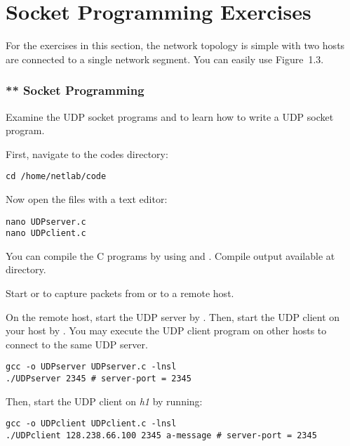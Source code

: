 \documentclass{../UTNetLab}
\begin{document}
\part{Socket Programming Exercises}
For the exercises in this section, the network topology is simple with two hosts are connected to a single network segment.
You can easily use Figure~1.3.

\section{** Socket Programming}
Examine the UDP socket programs  and  to learn how to write a UDP socket program.

First, navigate to the codes directory:

\begin{lstlisting}
cd /home/netlab/code
\end{lstlisting}

Now open the files with a text editor:

\begin{lstlisting}
nano UDPserver.c
nano UDPclient.c
\end{lstlisting}

You can compile the C programs by using  and .
Compile output available at  directory.

Start  or  to capture packets from or to a remote host.

On the remote host, start the UDP server by .
Then, start the UDP client on your host by .
You may execute the UDP client program on other hosts to connect to the same UDP server.

\begin{lstlisting}[emph={server-port}]
gcc -o UDPserver UDPserver.c -lnsl
./UDPserver 2345 # server-port = 2345
\end{lstlisting}

Then, start the UDP client on \textit{h1} by running:

\begin{lstlisting}[emph={server-port, a-message}]
gcc -o UDPclient UDPclient.c -lnsl
./UDPclient 128.238.66.100 2345 a-message # server-port = 2345
\end{lstlisting}
\end{document}
